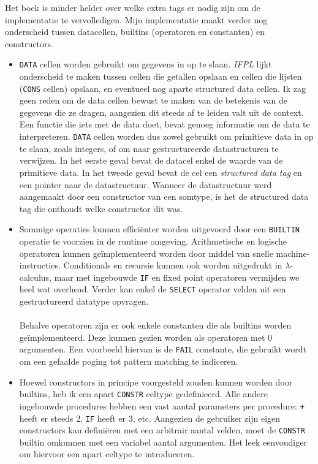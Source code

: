 \documentclass[a4paper,10pt]{article}
\begin{document}
Het boek is minder helder over welke extra tags er nodig zijn om de implementatie te vervolledigen.
Mijn implementatie maakt verder nog onderscheid tussen datacellen, builtins (operatoren en constanten) en constructors.
\begin{itemize}
\item
  \texttt{DATA} cellen worden gebruikt om gegevens in op te slaan.
  \emph{IFPL} lijkt onderscheid te maken tussen cellen die getallen opslaan en cellen die lijsten (\texttt{CONS} cellen) opslaan, en eventueel nog aparte structured data cellen.
  Ik zag geen reden om de data cellen bewust te maken van de betekenis van de gegevens die ze dragen, aangezien dit steeds af te leiden valt uit de context.
  Een functie die iets met de data doet, bevat genoeg informatie om de data te interpreteren.
  \texttt{DATA} cellen worden dus zowel gebruikt om primitieve data in op te slaan, zoals integers, of om naar gestructureerde datastructuren te verwijzen.
  In het eerste geval bevat de datacel enkel de waarde van de primitieve data.
  In het tweede geval bevat de cel een \emph{structured data tag} en een pointer naar de datastructuur.
  Wanneer de datastructuur werd aangemaakt door een constructor van een somtype, is het de structured data tag die onthoudt welke constructor dit was.
\item
  Sommige operaties kunnen effici{\"e}nter worden uitgevoerd door een \texttt{BUILTIN} operatie te voorzien in de runtime omgeving.
  Arithmetische en logische operatoren kunnen ge{\"i}mplementeerd worden door middel van snelle machine-instructies.
  Conditionals en recursie kunnen ook worden uitgedrukt in $\lambda$-calculus, maar met ingebouwde \texttt{IF} en fixed point operatoren vermijden we heel wat overhead.
  Verder kan enkel de \texttt{SELECT} operator velden uit een gestructureerd datatype opvragen.
  \paragraph{}
  Behalve operatoren zijn er ook enkele constanten die als builtins worden ge{\"i}mplementeerd.
  Deze kunnen gezien worden als operatoren met 0 argumenten.
  Een voorbeeld hiervan is de \texttt{FAIL} constante, die gebruikt wordt om een gefaalde poging tot pattern matching te indiceren.
\item
  Hoewel constructors in principe voorgesteld zouden kunnen worden door builtins, heb ik een apart \texttt{CONSTR} celtype gedefinieerd.
  Alle andere ingebouwde procedures hebben een vast aantal parameters per procedure: \texttt{+} heeft er steeds 2, \texttt{IF} heeft er 3, etc.
  Aangezien de gebruiker zijn eigen constructors kan defini{\"e}ren met een arbitrair aantal velden, moet de \texttt{CONSTR} builtin omkunnen met een variabel aantal argumenten.
  Het leek eenvoudiger om hiervoor een apart celtype te introduceren.
\end{itemize}
\end{document}
